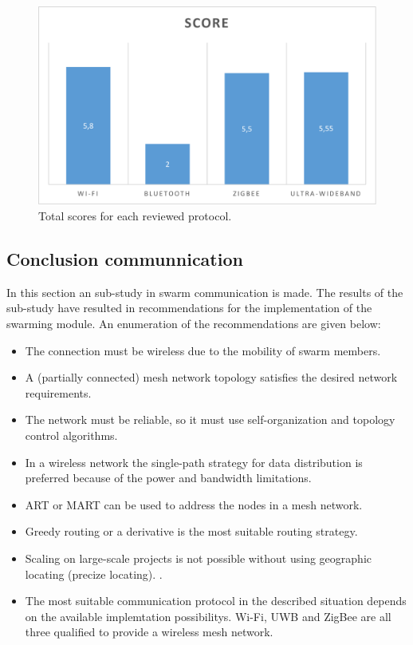\documentclass[10pt,a4paper]{article}
\begin{document}
\begin{figure}[H]
   \centering
   \includegraphics[width=1\textwidth]{protocolcomparison}
   \caption{Total scores for each reviewed protocol.}
   \label{fig:protocolcomparison}
\end{figure}


\newpage
\subsection{Conclusion communnication}
In this section an sub-study in swarm communication is made. The results of the sub-study have resulted in recommendations for the implementation of the swarming module. An enumeration of the recommendations are given below:
\begin{itemize}
\setlength\itemsep{0em}
    \item The connection must be wireless due to the mobility of swarm members.
    \item A (partially connected) mesh network topology satisfies the desired network requirements.
    \item The network must be reliable, so it must use self-organization and topology control algorithms. \cite{WMN1}
    \item In a wireless network the single-path strategy for data distribution is preferred because of the power and bandwidth limitations. \cite{position-based}
    \item ART or MART can be used to address the nodes in a mesh network.
    \item Greedy routing or a derivative is the most suitable routing strategy.
    \item Scaling on large-scale projects is not possible without using geographic locating (precize locating). \cite{geographicalrouting}\cite{scalablelocation}. 
    \item The most suitable communication protocol in the described situation depends on the available implemtation possibilitys. Wi-Fi, UWB and ZigBee are all three qualified to provide a wireless mesh network.
\end{itemize}
\end{document}
